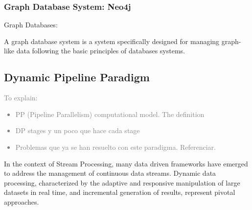 

\subsubsection*{Graph Database System: Neo4j}

Graph Databases: \textcolor{blue}{\cite{GDB-angles2008survey, GDB-kumar2015graph}}

A graph database system is a system specifically designed for managing graph-like data following the basic principles of databases systems. 

\subsection{Dynamic Pipeline Paradigm}\label{DPP}

\textcolor{gray}{To explain:
\begin{itemize}
    \item PP (Pipeline Parallelism) computational model. The definition
    \item DP stages y un poco que hace cada stage
    \item Problemas que ya se han resuelto con este paradigma. Referenciar.
\end{itemize}
}


In the context of Stream Processing, many data driven frameworks have emerged to address the management of continuous data streams. Dynamic data processing, characterized by the adaptive and responsive manipulation of large datasets in real time, and incremental generation of results, represent pivotal approaches.\\

